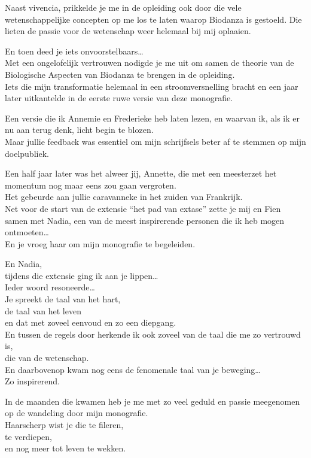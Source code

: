 \documentclass[
  11pt,
]{book}
\begin{document}
Naast vivencia, prikkelde je me in de opleiding ook door die vele wetenschappelijke concepten op me los te laten waarop Biodanza is gestoeld.
Die lieten de passie voor de wetenschap weer helemaal bij mij oplaaien.

En toen deed je iets onvoorstelbaars\ldots{}\\
Met een ongelofelijk vertrouwen
nodigde je me uit om samen de theorie van de Biologische Aspecten van Biodanza te brengen in de opleiding.\\
Iets die mijn transformatie helemaal in een stroomversnelling bracht en een jaar later uitkantelde in de eerste ruwe versie van deze monografie.

Een versie die ik Annemie en Frederieke heb laten lezen,
en waarvan ik, als ik er nu aan terug denk, licht begin te blozen.\\
Maar jullie feedback was essentiel om mijn schrijfsels beter af te stemmen op mijn doelpubliek.

Een half jaar later was het alweer jij, Annette,
die met een meesterzet het momentum nog maar eens zou gaan vergroten.\\
Het gebeurde aan jullie caravanneke
in het zuiden van Frankrijk.\\
Net voor de start van de extensie ``het pad van extase'' zette je mij en Fien samen met Nadia, een van de meest inspirerende personen die ik heb mogen ontmoeten\ldots{}\\
En je vroeg haar om mijn monografie te begeleiden.

En Nadia,\\
tijdens die extensie ging ik aan je lippen\ldots{}\\
Ieder woord resoneerde\ldots{}\\
Je spreekt de taal van het hart,\\
de taal van het leven\\
en dat met zoveel eenvoud en zo een diepgang.\\
En tussen de regels door
herkende ik ook zoveel van
de taal die me zo vertrouwd is,\\
die van de wetenschap.\\
En daarbovenop kwam nog eens de fenomenale taal van je beweging\ldots{}\\
Zo inspirerend.

In de maanden die kwamen heb je me met zo veel geduld en passie
meegenomen op de wandeling door mijn monografie.\\
Haarscherp wist je die te fileren,\\
te verdiepen,\\
en nog meer tot leven te wekken.
\end{document}

